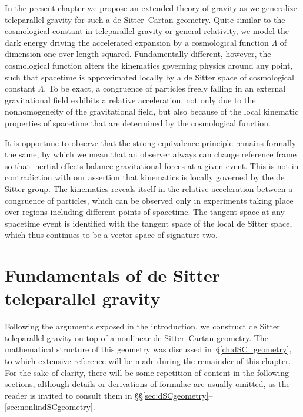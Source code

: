 \documentclass[
final,
11pt,
a4paper,
DIV=11,
headinclude=true,
footinclude=false,
bibliography=totoc,
twoside=true,  %
BCOR=5mm
]{scrbook}
\begin{document}
In the present chapter we propose an extended theory of gravity 
as we generalize teleparallel gravity for such a de 
Sitter--Cartan geometry. Quite similar to the cosmological 
constant in teleparallel gravity or general relativity, we model 
the dark energy driving the accelerated expansion by 
a cosmological function $\Lambda$ of dimension one over length 
squared.  Fundamentally different, however, the cosmological 
function alters the kinematics governing physics around any 
point, such that spacetime is approximated locally by a de Sitter 
space of cosmological constant $\Lambda$. To be exact, 
a congruence of particles freely falling in an external 
gravitational field exhibits a relative acceleration, not only 
due to the nonhomogeneity of the gravitational field, but also 
because of the local kinematic properties of spacetime that are 
determined by the cosmological function.

It is opportune to observe that the strong equivalence principle 
remains formally the same, by which we mean that an observer 
always can change reference frame so that inertial effects 
balance gravitational forces at a given event. This is not in 
contradiction with our assertion that kinematics is locally 
governed by the de Sitter group. The kinematics reveals itself in 
the relative acceleration between a congruence of particles, 
which can be observed only in experiments taking place over 
regions including different points of spacetime. The tangent 
space at any spacetime event is identified with the tangent space 
of the local de Sitter space, which thus continues to be a vector 
space of signature two.

\section{Fundamentals of de Sitter teleparallel gravity}
\label{sec:FunddeSitterTG}

Following the arguments exposed in the introduction, we construct 
de Sitter teleparallel gravity on top of a nonlinear de 
Sitter--Cartan geometry. The mathematical structure of this 
geometry was discussed in~\S\ref{ch:dSC_geometry}, to which 
extensive reference will be made during the remainder of this 
chapter. For the sake of clarity, there will be some repetition 
of content in the following sections, although details or 
derivations of formulae are usually omitted, as the reader is 
invited to consult them in 
\S\S\ref{sec:dSCgeometry}--\ref{sec:nonlindSCgeometry}. 
\end{document}
